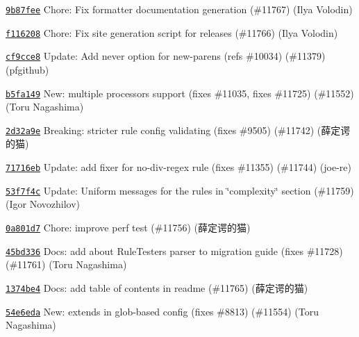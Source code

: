 \begin{DoxyItemize}
\item \href{https://github.com/eslint/eslint/commit/9b87fee9dc7b1d99a50b924cb6b81255ebb5c4a2}{\texttt{ {\ttfamily 9b87fee}}} Chore\+: Fix formatter documentation generation (\#11767) (Ilya Volodin)
\item \href{https://github.com/eslint/eslint/commit/f11620848733a3a6f58811d9bb2c3e748d6135ac}{\texttt{ {\ttfamily f116208}}} Chore\+: Fix site generation script for releases (\#11766) (Ilya Volodin)
\item \href{https://github.com/eslint/eslint/commit/cf9cce81aa68e9bc23840530cb33f4c3f551fb1e}{\texttt{ {\ttfamily cf9cce8}}} Update\+: Add never option for new-\/parens (refs \#10034) (\#11379) (pfgithub)
\item \href{https://github.com/eslint/eslint/commit/b5fa1491d2371a721e4b5029e797ae98fd30fed2}{\texttt{ {\ttfamily b5fa149}}} New\+: multiple processors support (fixes \#11035, fixes \#11725) (\#11552) (Toru Nagashima)
\item \href{https://github.com/eslint/eslint/commit/2d32a9e8dd10a5927576bd50d184876c775da4af}{\texttt{ {\ttfamily 2d32a9e}}} Breaking\+: stricter rule config validating (fixes \#9505) (\#11742) (薛定谔的猫)
\item \href{https://github.com/eslint/eslint/commit/71716eba3155266d777b994a38af524952e97696}{\texttt{ {\ttfamily 71716eb}}} Update\+: add fixer for no-\/div-\/regex rule (fixes \#11355) (\#11744) (joe-\/re)
\item \href{https://github.com/eslint/eslint/commit/53f7f4cf8d8b66a1911db56e4f72764388a21cc4}{\texttt{ {\ttfamily 53f7f4c}}} Update\+: Uniform messages for the rules in \char`\"{}complexity\char`\"{} section (\#11759) (Igor Novozhilov)
\item \href{https://github.com/eslint/eslint/commit/0a801d702dc41dae7eac0c802b822493ddc3ac41}{\texttt{ {\ttfamily 0a801d7}}} Chore\+: improve perf test (\#11756) (薛定谔的猫)
\item \href{https://github.com/eslint/eslint/commit/45bd336e647a6fa8a502488e5cbd27ba02712083}{\texttt{ {\ttfamily 45bd336}}} Docs\+: add about Rule\+Tester\textquotesingle{}s parser to migration guide (fixes \#11728) (\#11761) (Toru Nagashima)
\item \href{https://github.com/eslint/eslint/commit/1374be44f7ec4b8c913c52cc84debc4012c4f3ea}{\texttt{ {\ttfamily 1374be4}}} Docs\+: add table of contents in readme (\#11765) (薛定谔的猫)
\item \href{https://github.com/eslint/eslint/commit/54e6edaa2f881aab530fa14e63d92e5e0e2ca55c}{\texttt{ {\ttfamily 54e6eda}}} New\+: extends in glob-\/based config (fixes \#8813) (\#11554) (Toru Nagashima)

\end{DoxyItemize}
